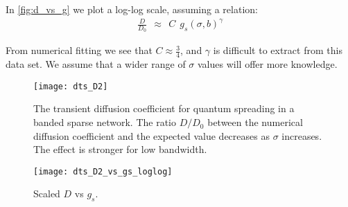 In \autoref{fig:d_vs_g} we plot a log-log scale, assuming a relation:
%
\begin{align}
\frac{D}{D_0}\ \ \approx \ \ C\ \ g_s(\sigma,b)^\gamma
\end{align}

From numerical fitting we see that $C\approx \frac{3}{4}$, 
and $\gamma$ is difficult to extract from this data set. We assume
that a wider range of $\sigma$ values will offer more knowledge.

\begin{figure}
\texttt{[image: dts\_D2]}
\caption{The transient diffusion coefficient for quantum spreading in
a banded sparse network. The ratio $D/D_0$ between the numerical diffusion 
coefficient and the expected value decreases as $\sigma$ increases. The effect
is stronger for low bandwidth.}\label{fig:D_of_s}
\end{figure}


\begin{figure}
\texttt{[image: dts\_D2\_vs\_gs\_loglog]}
\caption{Scaled $D$ vs $g_s$. }\label{fig:d_vs_g}
\end{figure}
